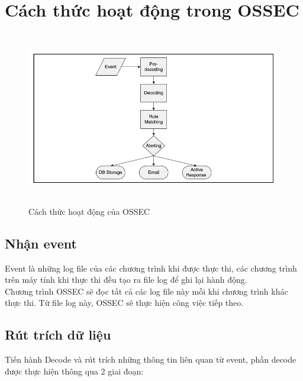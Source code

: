 \section{Cách thức hoạt động trong OSSEC}
  \begin{figure}[h!]
	\centering 
	\includegraphics[width=6in,height=3in,keepaspectratio=true]{eventFlow.png}
	\caption{Cách thức hoạt động của OSSEC}
  \end{figure}
  
     \subsection{Nhận event}
     Event là những log file của các chương trình khi được thực thi, các
     chương trình trên máy tính khi thực thi đều tạo ra file log để ghi lại hành
     động.\\
     Chương trình OSSEC sẽ đọc tất cả các log file này mỗi khi chương
     trình khác thực thi. Từ file log này, OSSEC sẽ thực hiện công việc tiếp theo.
     \subsection{Rút trích dữ liệu}
     Tiến hành Decode và rút trích những thông tin liên quan từ event,
     phần decode được thực hiện thông qua 2 giai đoạn:\\
